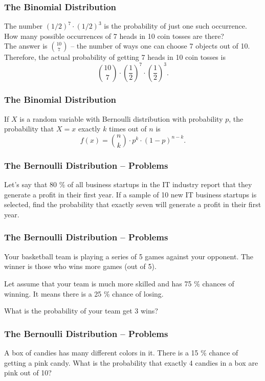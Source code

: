 \documentclass[aspectratio=169,11pt,usenames,dvipsnames]{beamer}
\begin{document}
\begin{frame}
 \frametitle{The Binomial Distribution}
 The number $(1 / 2)^{7} \cdot (1 / 2)^3$ is the probability of \alert{just one
 such occurrence}.\\ \pause
 How many possible occurrences of 7 heads in 10 coin tosses are there?\\ \pause
 The answer is $\binom{10}{7}$ -- the number of ways one can choose 7 objects
 out of 10.\\ \pause
 Therefore, the \alert{actual probability} of getting 7 heads in 10 coin tosses
 is 
 \[
  \binom{10}{7} \cdot \left( \frac{1}{2} \right)^{7} \cdot \left( \frac{1}{2}
  \right)^3.
 \]
\end{frame}

\begin{frame}
 \frametitle{The Binomial Distribution}
 \begin{tcolorbox}[title=Def\hspace{0pt}inition]
  If $X$ is a random variable with \alert{Bernoulli distribution} with
  probability $p$, the probability that $X = x$ exactly $k$ times out of $n$ is
  \[
   f(x) = \binom{n}{k} \cdot p^{k} \cdot (1-p)^{n-k}.
  \]
 \end{tcolorbox}
\end{frame}

\begin{frame}
 \frametitle{The Bernoulli Distribution -- Problems}
 Let’s say that 80 \% of all business startups in the IT industry report that
 they generate a profit in their first year. If a sample of 10 new IT business
 startups is selected, find the probability that exactly seven will generate a
 profit in their first year.
\end{frame}

\begin{frame}
 \frametitle{The Bernoulli Distribution -- Problems}
 Your basketball team is playing a series of 5 games against your opponent. The winner is those who wins more games (out of 5).

 Let assume that your team is much more skilled and has 75 \% chances of winning.
 It means there is a 25 \% chance of losing.

 What is the probability of your team get 3 wins?
\end{frame}

\begin{frame}
 \frametitle{The Bernoulli Distribution -- Problems}
 A box of candies has many different colors in it. There is a 15 \% chance of
 getting a pink candy. What is the probability that exactly 4 candies in a box
 are pink out of 10?
\end{frame}
\end{document}
